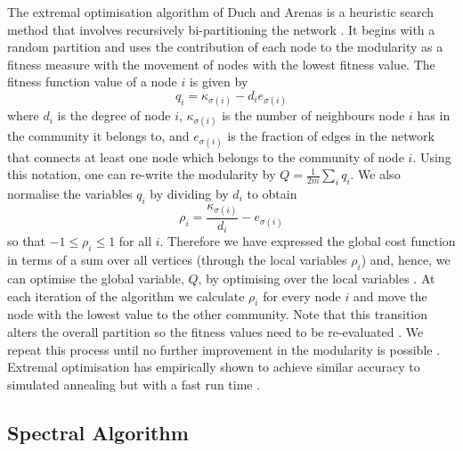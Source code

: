 The extremal optimisation algorithm of Duch and Arenas \cite{DA05} is a heuristic search method that involves recursively bi-partitioning the network \cite{DA05,For10}.
It begins with a random partition and uses the contribution of each node to the modularity as a fitness measure with the movement of nodes with the lowest fitness value.
The fitness function value of a node $i$ is given by
\begin{equation}
	\label{eq:fitnessFunction}
	q_{i} = \kappa_{\sigma(i)} - d_{i}e_{\sigma(i)}
\end{equation}
where $d_{i}$ is the degree of node $i$, $\kappa_{\sigma(i)}$ is the number of neighbours node $i$ has in the community it belongs to, and $e_{\sigma(i)}$ is the fraction of edges in the network that connects at least one node which belongs to the community of node $i$.
Using this notation, one can re-write the modularity by $Q = \frac{1}{2m} \sum_{i} q_{i}$.
We also normalise the variables $q_{i}$ by dividing by $d_{i}$ to obtain
\begin{equation}
	\label{eq:normalisedFitnessFunction}
	\rho_{i} = \frac{\kappa_{\sigma(i)}}{d_{i}} - e_{\sigma(i)}
\end{equation}
so that $-1 \leq \rho_{i}  \leq 1$ for all $i$.
Therefore we have expressed the global cost function in terms of a sum over all vertices (through the local variables $\rho_{i}$) and, hence, we can optimise the global variable, $Q$, by optimising over the local variables \cite{For10}.
At each iteration of the algorithm we calculate $\rho_{i}$ for every node $i$ and move the node with the lowest value to the other community.
Note that this transition alters the overall partition so the fitness values need to be re-evaluated \cite{DA05,For10}.
We repeat this process until no further improvement in the modularity is possible \cite{DA05,For10}.
Extremal optimisation has empirically shown to achieve similar accuracy to simulated annealing but with a fast run time \cite{For10}.


\subsection{Spectral Algorithm}
\label{subsec:spectralAlgorithm}

